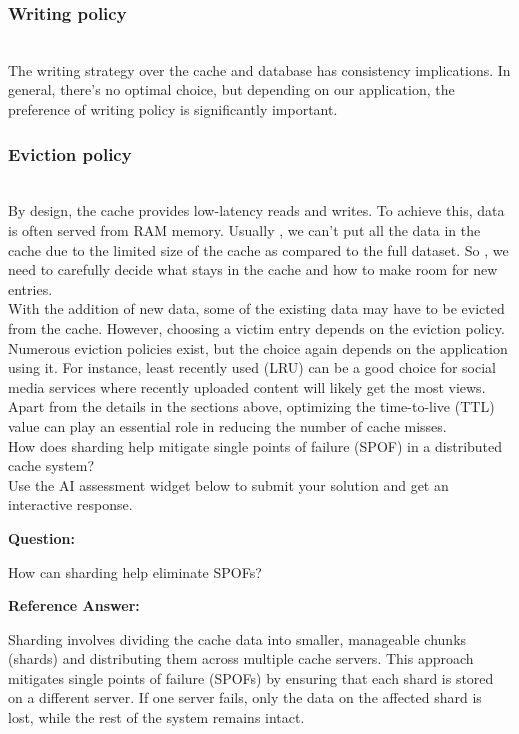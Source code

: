\subsubsection{Writing policy}\label{gZpJMYaWE01Nm2mAGOZol}
\\
The writing strategy over the cache and database has consistency implications. In general, there's no optimal choice, but depending on our application, the preference of writing policy is significantly important.

\subsubsection{Eviction policy}\label{rCnXfAN6ypmaJr57Z_tEK}
\\
By design, the cache provides low-latency reads and writes. To achieve this, data is often served from RAM memory. Usually , we can't put all the data in the cache due to the limited size of the cache as compared to the full dataset. So
, we need to carefully decide what stays in the cache and how to make room for new entries.
\\
With the addition of new data, some of the existing data may have to be evicted from the cache. However, choosing a victim entry depends on the eviction policy. Numerous eviction policies exist, but the choice again depends on the application using it. For instance, least recently used (LRU) can be a good choice for social media services where recently uploaded content will likely get the most views.
\\
Apart from the details in the sections above, optimizing the time-to-live (TTL) value can play an essential role in reducing the number of cache misses.
\\
How does sharding help mitigate single points of failure (SPOF) in a distributed cache system?
\\
Use the AI assessment widget below to submit your solution and get an interactive response.

\textbf{Question:}

How can sharding help eliminate SPOFs?

\textbf{Reference Answer:}

Sharding involves dividing the cache data into smaller, manageable chunks (shards) and distributing them across multiple cache servers. This approach mitigates single points of failure (SPOFs) by ensuring that each shard is stored on a different server. If one server fails, only the data on the affected shard is lost, while the rest of the system remains intact.

